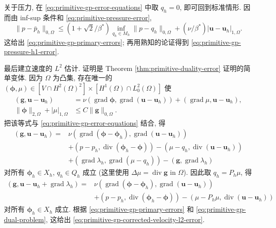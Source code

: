 \begin{Proof}
关于压力, 在 \eqref{eq:primitive-gp-error-equations} 中取 $q_h=0$,
即可回到标准情形. 因而由 inf-sup 条件和
\eqref{eq:primitive-pressure-error},
\[
\|p-\bar p_h\|_{0,\Omega}
\leq(1+\sqrt2/\beta^*)\inf_{q_h\in M_h}\|p-q_h\|_{0,\Omega}
+(\nu/\beta^*)|\mathbf u-\mathbf u_h|_{1,\Omega}.
\]
这给出 \eqref{eq:primitive-gp-primary-errors}; 再用熟知的论证得到
\eqref{eq:primitive-gp-pressure-h1-error}.

最后建立速度的 $L^2$ 估计. 证明是 Theorem
\ref{thm:primitive-duality-error} 证明的简单变体. 因为 $\Omega$ 为凸集,
存在唯一的
$(\boldsymbol\phi,\mu)\in[V\cap H^2(\Omega)^2]
\times[H^1(\Omega)\cap L_0^2(\Omega)]$ 使
\begin{equation}\label{eq:primitive-gp-dual-problem}
\begin{aligned}
(\mathbf g,\mathbf u-\mathbf u_h)
&=\nu(\operatorname{grad}\boldsymbol\phi,
\operatorname{grad}(\mathbf u-\mathbf u_h))
+(\operatorname{grad}\mu,\mathbf u-\mathbf u_h),\\
\|\boldsymbol\phi\|_{2,\Omega}+|\mu|_{1,\Omega}
&\leq C\|\mathbf g\|_{0,\Omega}.
\end{aligned}
\end{equation}
把该等式与 \eqref{eq:primitive-gp-error-equations} 结合, 得
\[
\begin{aligned}
(\mathbf g,\mathbf u-\mathbf u_h)
={}&\nu(\operatorname{grad}(\boldsymbol\phi-\boldsymbol\phi_h),
\operatorname{grad}(\mathbf u-\mathbf u_h))\\
&+(p-p_h,\operatorname{div}(\boldsymbol\phi_h-\boldsymbol\phi))
-(\mu-q_h,\operatorname{div}(\mathbf u-\mathbf u_h))\\
&+(\operatorname{grad}\lambda_h,
\operatorname{grad}(\mu-q_h))
-(\mathbf g,\operatorname{grad}\lambda_h)
\end{aligned}
\]
对所有 $\boldsymbol\phi_h\in X_h$, $q_h\in Q_h$ 成立
(这里使用 $\Delta\mu=\operatorname{div}\mathbf g$ in $\Omega$).
因此取 $q_h=P_h\mu$, 得
\[
\begin{aligned}
(\mathbf g,\mathbf u-\mathbf u_h+\operatorname{grad}\lambda_h)
={}&\nu(\operatorname{grad}(\boldsymbol\phi-\boldsymbol\phi_h),
\operatorname{grad}(\mathbf u-\mathbf u_h))\\
&+(p-p_h,\operatorname{div}(\boldsymbol\phi_h-\boldsymbol\phi))
-(\mu-P_h\mu,\operatorname{div}(\mathbf u-\mathbf u_h))
\end{aligned}
\]
对所有 $\boldsymbol\phi_h\in X_h$ 成立. 根据
\eqref{eq:primitive-gp-primary-errors} 和
\eqref{eq:primitive-gp-dual-problem}, 这给出
\eqref{eq:primitive-gp-corrected-velocity-l2-error}.
\end{Proof}


